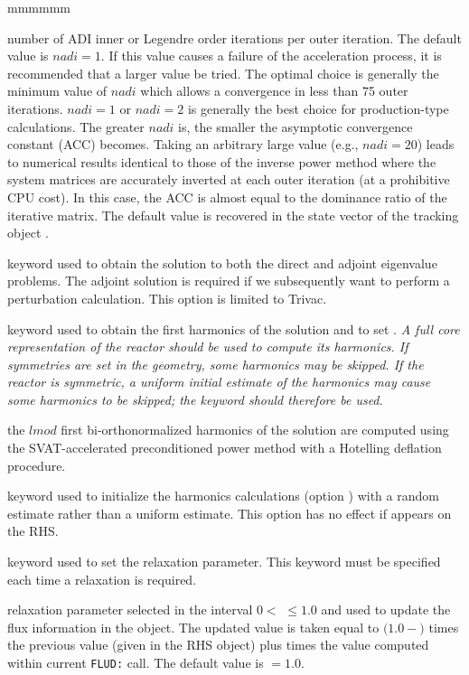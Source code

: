 \begin{ListeDeDescription}{mmmmmm}
\item[\dusa{nadi}] number of ADI inner or Legendre order iterations per outer iteration. The default value is $nadi=1$. If this value causes a failure of the acceleration process, it is recommended that a larger value be tried. The optimal
choice is generally the minimum value of $nadi$ which allows a convergence in
less than 75 outer iterations. $nadi=1$ or $nadi=2$ is generally the best
choice for production-type calculations. The greater $nadi$ is, the smaller 
the asymptotic convergence constant (ACC) becomes. Taking an arbitrary large
value (e.g., $nadi=20$) leads to numerical results identical to those of the
inverse power method where the system matrices are accurately inverted at each
outer iteration (at a prohibitive CPU cost). In this case, the ACC is almost
equal to the dominance ratio of the iterative matrix. The default value is
recovered in the state vector of the {\sc tracking} object .

\item[\moc{ADJ}] keyword used to obtain the solution to both the direct and adjoint eigenvalue problems.
The adjoint solution is required if we subsequently want to perform a perturbation calculation. This option is limited to Trivac.

\item[\moc{MONI}] keyword used to obtain the first harmonics of the solution and to set . {\sl A full core representation of the reactor should be used to compute its harmonics. If symmetries are set in the geometry, some harmonics may be skipped. If the reactor is symmetric, a uniform initial estimate of the harmonics may cause some harmonics to be skipped; the keyword  should therefore be used.}

\item[\dusa{lmod}] the $lmod$ first bi-orthonormalized harmonics of the solution are computed using the SVAT-accelerated preconditioned power method with a Hotelling deflation procedure.\cite{wilkinson}

\item[\moc{RAND}] keyword used to initialize the harmonics  calculations
(option ) with a random estimate rather than a uniform estimate.
This option has no effect if  appears on the RHS.

\item[\moc{RELAX}] keyword used to set the relaxation parameter. This keyword must be specified each time a relaxation is required.

\item[\dusa{relax}] relaxation parameter selected in the interval $0<$  $\le 1.0$ and used to update
the flux information in the  object. The updated value is taken equal to
$(1.0-$$)$ times the previous value (given in the RHS  object) plus  times the value computed within current {\tt FLUD:} call.
The default value is  $=1.0$.

\end{ListeDeDescription}
\clearpage

